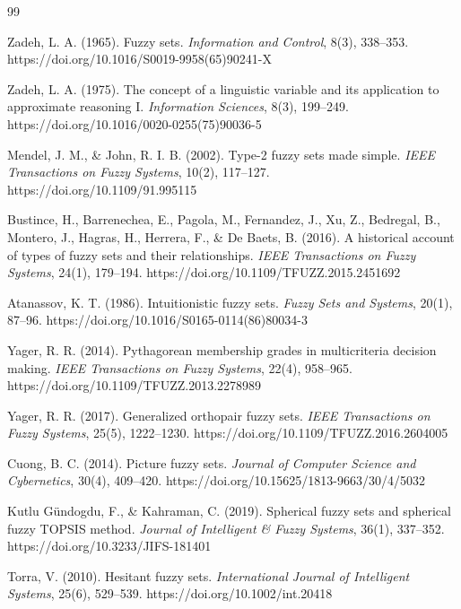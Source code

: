 \documentclass[reqno,final]{amsart}
\theoremstyle{definition}
\theoremstyle{plain}
\theoremstyle{remark}
\begin{document}
\begingroup
{}\fontsize{9}{10.35}\selectfont
\raggedright
\begin{thebibliography}{99}

Zadeh, L. A. (1965). Fuzzy sets. \textit{Information and Control}, 8(3), 338--353. https://doi.org/10.1016/S0019-9958(65)90241-X

Zadeh, L. A. (1975). The concept of a linguistic variable and its application to approximate reasoning I. \textit{Information Sciences}, 8(3), 199--249. https://doi.org/10.1016/0020-0255(75)90036-5

Mendel, J. M., \& John, R. I. B. (2002). Type-2 fuzzy sets made simple. \textit{IEEE Transactions on Fuzzy Systems}, 10(2), 117--127. https://doi.org/10.1109/91.995115

Bustince, H., Barrenechea, E., Pagola, M., Fernandez, J., Xu, Z., Bedregal, B., Montero, J., Hagras, H., Herrera, F., \& De Baets, B. (2016). A historical account of types of fuzzy sets and their relationships. \textit{IEEE Transactions on Fuzzy Systems}, 24(1), 179--194. https://doi.org/10.1109/TFUZZ.2015.2451692

Atanassov, K. T. (1986). Intuitionistic fuzzy sets. \textit{Fuzzy Sets and Systems}, 20(1), 87--96. https://doi.org/10.1016/S0165-0114(86)80034-3

Yager, R. R. (2014). Pythagorean membership grades in multicriteria decision making. \textit{IEEE Transactions on Fuzzy Systems}, 22(4), 958--965. https://doi.org/10.1109/TFUZZ.2013.2278989

Yager, R. R. (2017). Generalized orthopair fuzzy sets. \textit{IEEE Transactions on Fuzzy Systems}, 25(5), 1222--1230. https://doi.org/10.1109/TFUZZ.2016.2604005

Cuong, B. C. (2014). Picture fuzzy sets. \textit{Journal of Computer Science and Cybernetics}, 30(4), 409--420. https://doi.org/10.15625/1813-9663/30/4/5032

Kutlu G\"undogdu, F., \& Kahraman, C. (2019). Spherical fuzzy sets and spherical fuzzy TOPSIS method. \textit{Journal of Intelligent \& Fuzzy Systems}, 36(1), 337--352. https://doi.org/10.3233/JIFS-181401

Torra, V. (2010). Hesitant fuzzy sets. \textit{International Journal of Intelligent Systems}, 25(6), 529--539. https://doi.org/10.1002/int.20418


\end{thebibliography}
\end{document}
